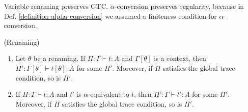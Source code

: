 
Variable renaming preserves GTC. $\alpha$-conversion preserves regularity, because
in Def. \ref{definition-alpha-conversion} 
we assumed a finiteness condition for $\alpha$-conversion.

\begin{proposition}(Renaming)
\label{prop:renaming}
  \begin{enumerate}
  \item\label{prop:renaming1}
    Let $\theta$ be a renaming.
    If $\Pi:\Gamma\vdash t:A$ and $\Gamma[\theta]$ is a context, 
    then $\Pi':\Gamma[\theta]\vdash t[\theta]:A$ for some $\Pi'$.
    Moreover, if $\Pi$ satisfies the global trace condition, so is $\Pi'$.
  \item\label{prop:renaming2}
    If $\Pi:\Gamma\vdash t:A$ and $t'$ is $\alpha$-equivalent to $t$,
    then $\Pi':\Gamma\vdash t':A$ for some $\Pi'$.
    Moreover, if $\Pi$ satisfies the global trace condition, so is $\Pi'$.
  \end{enumerate}
\end{proposition}


%
%

